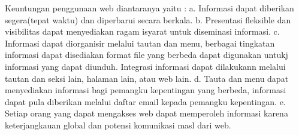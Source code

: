 \documentclass[12pt, a4paper]{article}
\begin{document}
Keuntungan penggunaan web diantaranya yaitu :
a. Informasi dapat diberikan segera(tepat waktu) dan diperbarui secara berkala.
b. Presentasi fleksible dan visibilitas dapat menyediakan ragam isyarat untuk diseminasi informasi.
c. Informasi dapat diorganisir melalui tautan dan menu, berbagai tingkatan informasi dapat disediakan format file yang berbeda dapat digunakan untukj informasi yang dapat diunduh. Integrasi informasi dapat dilakukann melalui tautan dan seksi lain, halaman lain, atau web lain.
d. Tauta  dan menu dapat menyediakan informasi bagi pemangku kepentingan yang berbeda, informasi dapat pula diberikan melalui daftar email kepada pemangku kepentingan.
e. Setiap orang yang dapat mengakses web dapat memperoleh informasi karena keterjangkauan global dan potensi komunikasi masl dari web.
	   
	   
\end{document}
